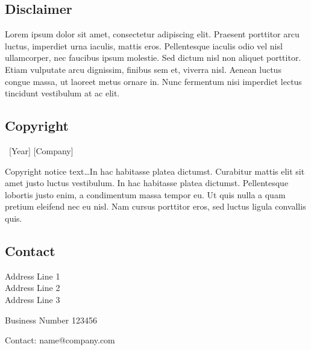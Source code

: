 

    \thispagestyle{empty} %

    \begin{twothirdswidth} %
        \footnotesize %

        \subsection*{Disclaimer}

        Lorem ipsum dolor sit amet, consectetur adipiscing elit. Praesent porttitor arcu luctus, imperdiet urna iaculis, mattis eros. Pellentesque iaculis odio vel nisl ullamcorper, nec faucibus ipsum molestie. Sed dictum nisl non aliquet porttitor. Etiam vulputate arcu dignissim, finibus sem et, viverra nisl. Aenean luctus congue massa, ut laoreet metus ornare in. Nunc fermentum nisi imperdiet lectus tincidunt vestibulum at ac elit.

        \subsection*{Copyright}

        \textcopyright~[Year] [Company]

        Copyright notice text\ldots In hac habitasse platea dictumst. Curabitur mattis elit sit amet justo luctus vestibulum. In hac habitasse platea dictumst. Pellentesque lobortis justo enim, a condimentum massa tempor eu. Ut quis nulla a quam pretium eleifend nec eu nisl. Nam cursus porttitor eros, sed luctus ligula convallis quis.

        \subsection*{Contact}

        Address Line 1\\
        Address Line 2\\
        Address Line 3

        Business Number 123456

        Contact: name@company.com


\end{twothirdswidth}
